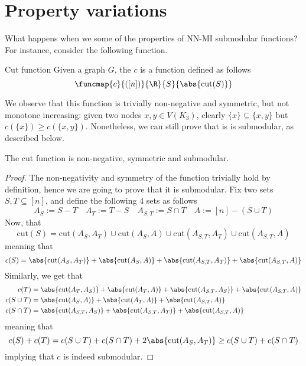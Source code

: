 \documentclass[a4paper, 12pt]{report}
\begin{document}
    \section{Property variations}

    What happens when we  some of the properties of NN-MI submodular functions? For instance, consider the following function.

    \begin{frameddefn}{Cut function}
        Given a graph $G$, the  $c$ is a function defined as follows $$\funcmap{c}{\mathcal([n])}{\R}{S}{\abs{\mathrm{cut}(S)}}$$
    \end{frameddefn}

    We observe that this function is trivially non-negative and symmetric, but not monotone increasing: given two nodes $x, y \in V(K_3)$, clearly $\{x\} \subseteq \{x, y\}$ but $c(\{x\}) \ge c(\{x, y\})$. Nonetheless, we can still prove that is is submodular, as described below.

    \begin{framedprop}{}
        The cut function is non-negative, symmetric and submodular.
    \end{framedprop}

    \begin{proof}
        The non-negativity and symmetry of the function trivially hold by definition, hence we are going to prove that it is submodular. Fix two sets $S, T \subseteq [n]$, and define the following 4 sets as follows $$A_S := S - T \quad A_T := T - S \quad A_{S, T} := S \cap T \quad A := [n] - (S \cup T)$$ Now, that $$\mathrm{cut}(S) = \mathrm{cut}(A_S, A_T) \cup \mathrm{cut}(A_S, A) \cup \mathrm{cut}(A_{S, T}, A_T) \cup \mathrm{cut}(A_{S, T}, A)$$ meaning that $$c(S) = \abs{\mathrm{cut}(A_S, A_T)} + \abs{\mathrm{cut}(A_S, A)} + \abs{\mathrm{cut}(A_{S, T}, A_T)} + \abs{\mathrm{cut}(A_{S, T}, A)}$$ Similarly, we get that
        \begin{equation*}
            \begin{split}
                c(T) &= \abs{\mathrm{cut}(A_T, A_S)} + \abs{\mathrm{cut}(A_T, A)} + \abs{\mathrm{cut}(A_{S, T}, A_S)} + \abs{\mathrm{cut}(A_{S, T}, A)} \\
                c(S \cup T) &= \abs{\mathrm{cut}(A_S, A)} + \abs{\mathrm{cut}(A_T, A)} + \abs{\mathrm{cut}(A_{S, T}, A)} \\
                c(S \cap T) &= \abs{\mathrm{cut}(A_{S, T}, A_S)} + \abs{\mathrm{cut}(A_{S, T}, A_T)} + \abs{\mathrm{cut}(A_{S, T}, A)}
            \end{split}
        \end{equation*}
        meaning that $$c(S) + c(T) = c(S \cup T) + c(S \cap T) + 2 \abs{\mathrm{cut}(A_S, A_T)} \ge c(S \cup T) + c(S \cap T)$$ implying that $c$ is indeed submodular.
    \end{proof}
\end{document}
